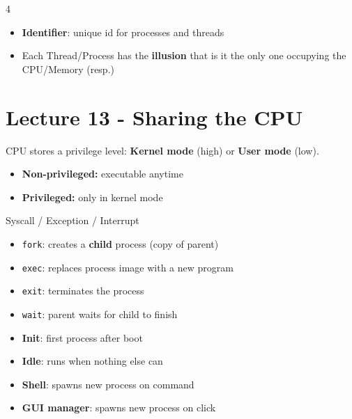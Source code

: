 \documentclass[8pt,a4paper,landscape]{extarticle}
\begin{document}
\begin{multicols*}{4}
\begin{thm}[title=Key properties]
    \begin{itemize}
        \item \textbf{Identifier}: unique id for processes and threads
        \item Each Thread/Process has the \textbf{illusion} that is it the only one occupying the CPU/Memory (resp.)
    \end{itemize}
\end{thm}

\section{Lecture 13 - Sharing the CPU}

\begin{prop}[title=CPU mode \& instructions]
    CPU stores a privilege level: \textbf{Kernel mode} (high) or \textbf{User mode} (low).
    \begin{itemize}
        \item \textbf{Non-privileged:} executable anytime
        \item \textbf{Privileged:} only in kernel mode
    \end{itemize}
\end{prop}

\begin{thm}[title=Limited direct execution (invoking the kernel)]
    Syscall / Exception / Interrupt
\end{thm}

\begin{prop}[title=Process lifecycle]
    \begin{itemize}
        \item \texttt{fork}: creates a \textbf{child} process (copy of parent)
        \item \texttt{exec}: replaces process image with a new program
        \item \texttt{exit}: terminates the process
        \item \texttt{wait}: parent waits for child to finish
    \end{itemize}
\end{prop}

\begin{prop}[title=Type of system processes]
    \begin{itemize}
        \item \textbf{Init}: first process after boot
        \item \textbf{Idle}: runs when nothing else can
        \item \textbf{Shell}: spawns new process on command
        \item \textbf{GUI manager}: spawns new process on click
    \end{itemize}
\end{prop}


\end{multicols*}
\end{document}
